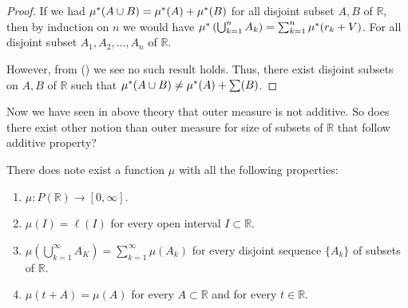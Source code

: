 \begin{proof}
    If we had $\mu^{*}(A\cup B)=\mu^{*}(A)+\mu^{*}(B)$ for all disjoint subset  $A,B$ of  $\mathds{R}$, then by induction on $n$ we would have $\mu^{*}\left(\bigcup_{k=1}^nA_k\right)=\sum_{k=1}^n\mu^{*}(r_k+V)$. For all disjoint subset $A_1,A_2,\dots,A_n$ of $\mathds{R}$.

    However, from () we see no such result holds. Thus, there exist disjoint subsets on $A,B$ of $\mathds{R}$ such that $\mu^{*}(A\cup B)\neq\mu^{*}(A)+\sum(B)$. 
\end{proof}

Now we have seen in above theory that outer measure is not additive. So does there exist other notion than outer measure for size of subsets of $\mathds{R}$ that follow additive property?
\begin{theorem}
    \label{no length for all set}
    There does note exist a function $\mu$ with all the following properties:
    \begin{enumerate}
        \item $\mu:P(\mathds{R})\to [0,\infty]$.
        \item $\mu(I)=\ell(I)$ for every open interval $I\subset \mathds{R}$.
        \item $\mu\left(\bigcup_{k=1}^{\infty}A_K\right)=\sum_{k=1}^{\infty}\mu(A_k)$ for every disjoint sequence $\{A_k\}$ of subsets of $\mathds{R}$.
        \item $\mu(t+A)=\mu(A)$ for  every $A\subset \mathds{R}$ and for every $t\in \mathds{R}$.
    \end{enumerate}
\end{theorem}
